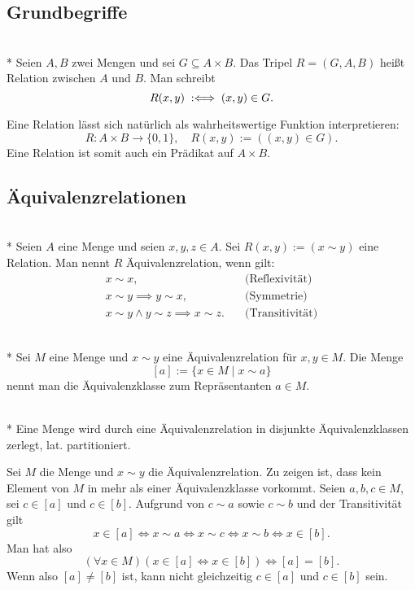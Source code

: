 \subsection{Grundbegriffe}

\begin{Definition}[Relation]\mbox{}\\*
Seien $A,B$ zwei Mengen und sei $G\subseteq A\times B$.
Das Tripel $R=(G,A,B)$ heißt Relation zwischen $A$ und $B$.
Man schreibt
\[R(x,y) \;:\Longleftrightarrow\; (x,y)\in G.\]
\end{Definition}
Eine Relation lässt sich natürlich als wahrheitswertige Funktion
interpretieren:
\[R\colon A\times B\to\{0,1\},\quad R(x,y):=((x,y)\in G).\]
Eine Relation ist somit auch ein Prädikat auf $A\times B$.

\subsection{Äquivalenzrelationen}
\begin{Definition}[Äquivalenzrelation]\mbox{}\\*
Seien $A$ eine Menge und seien $x,y,z\in A$. Sei $R(x,y):=(x\sim y)$ eine
Relation. Man nennt $R$ Äquivalenzrelation, wenn gilt:
\[\begin{array}{ll}
x\sim x, &\text{(Reflexivität)}\\
x\sim y \implies y\sim x, & \text{(Symmetrie)}\\
x\sim y\land y\sim z\implies x\sim z.\quad & \text{(Transitivität)}
\end{array}\]
\end{Definition}

\begin{Definition}[Äquivalenzklasse]\mbox{}\\*
Sei $M$ eine Menge und $x\sim y$ eine Äquivalenzrelation für $x,y\in M$.
Die Menge%
\[[a] := \{x\in M\mid x\sim a\}\]
nennt man die Äquivalenzklasse zum Repräsentanten $a\in M$.
\end{Definition}

\begin{Satz}\mbox{}\\*
Eine Menge wird durch eine Äquivalenzrelation in disjunkte
Äquivalenzklassen zerlegt, lat. partitioniert.
\end{Satz}
 Sei $M$ die Menge und $x\sim y$ die Äquivalenzrelation.
Zu zeigen ist, dass kein Element von $M$ in mehr als einer
Äquivalenzklasse vorkommt. Seien $a,b,c\in M$, sei $c\in [a]$
und $c\in [b]$. Aufgrund von $c\sim a$ sowie $c\sim b$ und der
Transitivität gilt%
\[x\in [a]\iff x\sim a\iff x\sim c\iff x\sim b\iff x\in [b].\]
Man hat also
\[(\forall x\in M)(x\in [a]\Leftrightarrow x\in [b])\iff [a]=[b].\]
Wenn also $[a]\ne [b]$ ist, kann nicht gleichzeitig $c\in [a]$ und $c\in [b]$
sein.\;\qedsymbol


